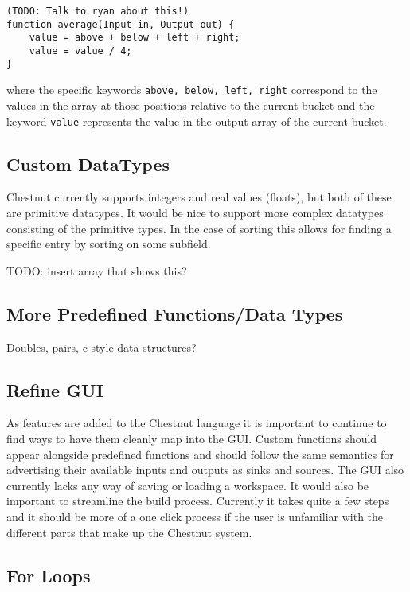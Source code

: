 \documentclass[twocolumn]{article}
\renewcommand{\|}{\origbar} %
\newcommand{\code}[1]{\texttt{#1}}
\begin{document}
\begin{Code Snippet}
\begin{verbatim}
(TODO: Talk to ryan about this!)
function average(Input in, Output out) {
    value = above + below + left + right;
    value = value / 4;
}
\end{verbatim}
\end{Code Snippet}

where the specific keywords \code{above, below, left, right} correspond to the values in the array at those positions relative to the current bucket and the keyword \code{value} represents the value in the output array of the current bucket.

\subsection{Custom DataTypes}

Chestnut currently supports integers and real values (floats), but both of these are primitive datatypes. It would be nice to support more complex datatypes consisting of the primitive types. In the case of sorting this allows for finding a specific entry by sorting on some subfield.

TODO: insert array that shows this?

\subsection{More Predefined Functions/Data Types}

Doubles, pairs, c style data structures?

\subsection{Refine GUI}

As features are added to the Chestnut language it is important to continue to find ways to have them cleanly map into the GUI. Custom functions should appear alongside predefined functions and should follow the same semantics for advertising their available inputs and outputs as sinks and sources. The GUI also currently lacks any way of saving or loading a workspace. It would also be important to streamline the build process. Currently it takes quite a few steps and it should be more of a one click process if the user is unfamiliar with the different parts that make up the Chestnut system.

\subsection{For Loops}



\end{document}
